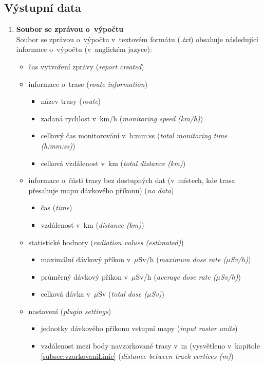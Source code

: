 \subsection{Výstupní data}
\label{sec:VystupniData}
\begin{enumerate}
	\item \textbf{Soubor se zprávou o~výpočtu} \\ Soubor se
zprávou o~výpočtu v~textovém formátu (\textit{.txt}) obsahuje
následující informace o~výpočtu (v~anglickém jazyce):
		\begin{itemize}
			\item čas vytvoření zprávy (\textit{report
created})
			
			\item informace o~trase (\textit{route
information})
			\begin{itemize}
				\item název trasy (\textit{route})
				\item zadaná rychlost v~km/h
(\textit{monitoring speed (km/h)})
				\item celkový čas monitorování
v~h:mm:ss (\textit{total monitoring time (h:mm:ss)})
				\item celková vzdálenost v~km
(\textit{total distance (km)})
			\end{itemize}
			
			\item informace o~části trasy bez dostupných
dat (v~místech, kde trasa přesahuje mapu dávkového příkonu)
(\textit{no data})
			\begin{itemize}
				\item čas (\textit{time})
				\item vzdálenost v~km
(\textit{distance (km)})
			\end{itemize}
			
			\item statistické hodnoty (\textit{radiation
values (estimated)})
			\begin{itemize}
				\item maximální dávkový příkon
v~$\mu$Sv/h (\textit{maximum dose rate ($\mu$Sv/h)})
				\item průměrný dávkový příkon
v~$\mu$Sv/h (\textit{average dose rate ($\mu$Sv/h)})
				\item celková dávka v~$\mu$Sv
(\textit{total dose ($\mu$Sv)})
			\end{itemize}
			
			\item nastavení (\textit{plugin settings})
			\begin{itemize}
				\item jednotky dávkového příkonu
vstupní mapy (\textit{input raster units})
				\item vzdálenost mezi body
navzorkované trasy v~m (vysvětleno v~kapitole
\ref{subsec:vzorkovaniLinie} (\textit{distance between track vertices
(m)})
			\end{itemize}
			

\end{itemize}
\end{enumerate}
